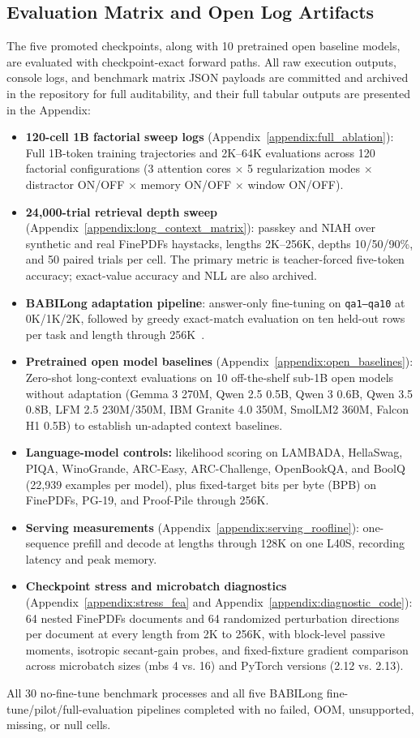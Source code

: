 \documentclass{article} %
\begin{document}
\subsection{Evaluation Matrix and Open Log Artifacts}
The five promoted checkpoints, along with 10 pretrained open baseline models, are evaluated with checkpoint-exact forward paths. All raw execution outputs, console logs, and benchmark matrix JSON payloads are committed and archived in the repository for full auditability, and their full tabular outputs are presented in the Appendix:
\begin{itemize}
    \item \textbf{120-cell 1B factorial sweep logs} (Appendix~\ref{appendix:full_ablation}): Full 1B-token training trajectories and 2K--64K evaluations across 120 factorial configurations (3 attention cores $\times$ 5 regularization modes $\times$ distractor ON/OFF $\times$ memory ON/OFF $\times$ window ON/OFF).
    \item \textbf{24,000-trial retrieval depth sweep} (Appendix~\ref{appendix:long_context_matrix}): passkey and NIAH over synthetic and real FinePDFs haystacks, lengths 2K--256K, depths 10/50/90\%, and 50 paired trials per cell. The primary metric is teacher-forced five-token accuracy; exact-value accuracy and NLL are also archived.
    \item \textbf{BABILong adaptation pipeline}: answer-only fine-tuning on \texttt{qa1--qa10} at 0K/1K/2K, followed by greedy exact-match evaluation on ten held-out rows per task and length through 256K~\citep{babilong2024}.
    \item \textbf{Pretrained open model baselines} (Appendix~\ref{appendix:open_baselines}): Zero-shot long-context evaluations on 10 off-the-shelf sub-1B open models without adaptation (Gemma 3 270M, Qwen 2.5 0.5B, Qwen 3 0.6B, Qwen 3.5 0.8B, LFM 2.5 230M/350M, IBM Granite 4.0 350M, SmolLM2 360M, Falcon H1 0.5B) to establish un-adapted context baselines.
    \item \textbf{Language-model controls:} likelihood scoring on LAMBADA, HellaSwag, PIQA, WinoGrande, ARC-Easy, ARC-Challenge, OpenBookQA, and BoolQ (22,939 examples per model), plus fixed-target bits per byte (BPB) on FinePDFs, PG-19, and Proof-Pile through 256K.
    \item \textbf{Serving measurements} (Appendix~\ref{appendix:serving_roofline}): one-sequence prefill and decode at lengths through 128K on one L40S, recording latency and peak memory.
    \item \textbf{Checkpoint stress and microbatch diagnostics} (Appendix~\ref{appendix:stress_fea} and Appendix~\ref{appendix:diagnostic_code}): 64 nested FinePDFs documents and 64 randomized perturbation directions per document at every length from 2K to 256K, with block-level passive moments, isotropic secant-gain probes, and fixed-fixture gradient comparison across microbatch sizes (mbs 4 vs. 16) and PyTorch versions (2.12 vs. 2.13).
\end{itemize}
All 30 no-fine-tune benchmark processes and all five BABILong fine-tune/pilot/full-evaluation pipelines completed with no failed, OOM, unsupported, missing, or null cells.
\end{document}
